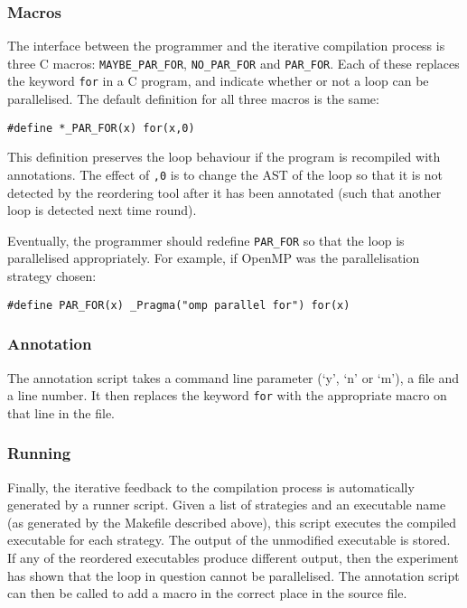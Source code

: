 \documentclass[journal]{IEEEtran}
\begin{document}
\subsubsection{Macros}

The interface between the programmer and the iterative compilation process is
three C macros: \texttt{MAYBE\_PAR\_FOR}, \texttt{NO\_PAR\_FOR} and
\texttt{PAR\_FOR}. Each of these replaces the keyword \texttt{for} in a C
program, and indicate whether or not a loop can be parallelised. The default
definition for all three macros is the same: 

\begin{lstlisting}
#define *_PAR_FOR(x) for(x,0)
\end{lstlisting}

This definition preserves the loop behaviour if the program is recompiled with
annotations. The effect of \texttt{,0} is to change the AST of the loop so that
it is not detected by the reordering tool after it has been annotated (such that
another loop is detected next time round).

Eventually, the programmer should redefine \texttt{PAR\_FOR} so that the loop is
parallelised appropriately. For example, if OpenMP \cite{dagum_openmp:_1998}
was the parallelisation strategy chosen:

\begin{lstlisting}
#define PAR_FOR(x) _Pragma("omp parallel for") for(x)
\end{lstlisting}

\subsubsection{Annotation}

The annotation script takes a command line parameter (`y', `n' or `m'), a file
and a line number. It then replaces the keyword \texttt{for} with the
appropriate macro on that line in the file.

\subsubsection{Running}

Finally, the iterative feedback to the compilation process is automatically
generated by a runner script. Given a list of strategies and an executable name
(as generated by the Makefile described above), this script executes the
compiled executable for each strategy. The output of the unmodified executable
is stored. If any of the reordered executables produce different output, then
the experiment has shown that the loop in question cannot be parallelised. The
annotation script can then be called to add a macro in the correct place in the
source file.
\end{document}
